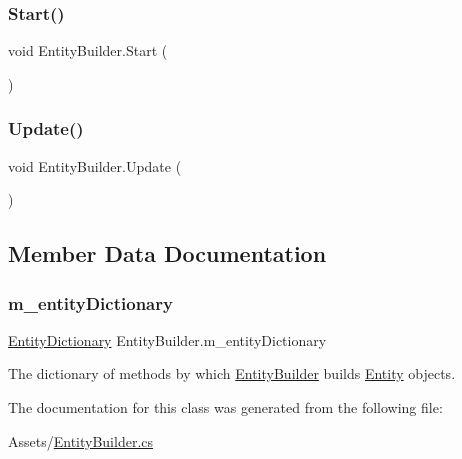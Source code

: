 \subsubsection{\texorpdfstring{Start()}{Start()}}
{\footnotesize\ttfamily void Entity\+Builder.\+Start (\begin{DoxyParamCaption}{ }\end{DoxyParamCaption})\hspace{0.3cm}{\ttfamily [private]}}

\mbox{\label{class_entity_builder_adc89d08acf62e569d3845fe95fe06611}} 
\subsubsection{\texorpdfstring{Update()}{Update()}}
{\footnotesize\ttfamily void Entity\+Builder.\+Update (\begin{DoxyParamCaption}{ }\end{DoxyParamCaption})\hspace{0.3cm}{\ttfamily [private]}}



\subsection{Member Data Documentation}
\mbox{\label{class_entity_builder_aff80495cf34b829bdb775ef12ad3bf2e}} 
\subsubsection{\texorpdfstring{m\+\_\+entity\+Dictionary}{m\_entityDictionary}}
{\footnotesize\ttfamily \hyperlink{class_entity_dictionary}{Entity\+Dictionary} Entity\+Builder.\+m\+\_\+entity\+Dictionary\hspace{0.3cm}{\ttfamily [private]}}



The dictionary of methods by which \hyperlink{class_entity_builder}{Entity\+Builder} builds \hyperlink{class_entity}{Entity} objects. 



The documentation for this class was generated from the following file\+:\begin{DoxyCompactItemize}
\item 
Assets/\hyperlink{_entity_builder_8cs}{Entity\+Builder.\+cs}\end{DoxyCompactItemize}
